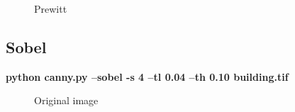     \begin{figure}[!htb]\centering
        \begin{minipage}{0.8\textwidth}
            \caption{\small{Prewitt}}\label{diagram:prewitt}
        \end{minipage}
    \end{figure}

\subsection{Sobel}

    \textbf{python canny.py --sobel -s 4 --tl 0.04 --th 0.10 building.tif}

    \begin{figure}[!htb]\centering
        \begin{minipage}{0.8\textwidth}
            \caption{\small{Original image}}\label{diagram:building}
        \end{minipage}
    \end{figure}

